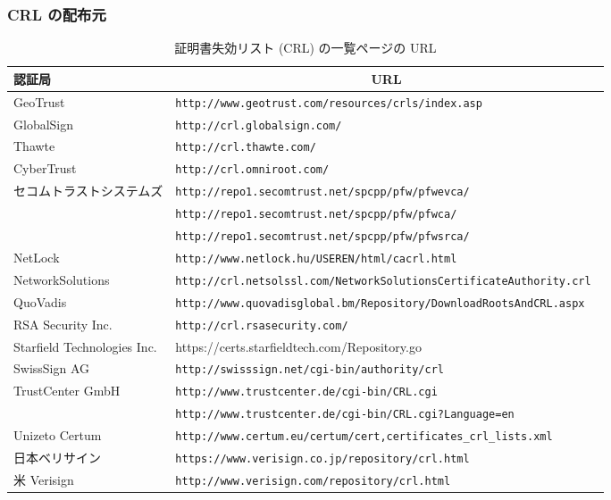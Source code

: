 \documentclass[mingoth,a4paper]{jsarticle}
\begin{document}
\subsubsection{CRL の配布元}

\begin{table}
\caption{証明書失効リスト (CRL) の一覧ページの URL}\label{tab:crlwebpage}
\begin{center}
\begin{tabular}{|l|l|}\hline
認証局 & \multicolumn{1}{c|}{URL} \\ \hline\hline
GeoTrust & \tt http://www.geotrust.com/resources/crls/index.asp  \\ \hline
GlobalSign & \tt http://crl.globalsign.com/ \\ \hline
Thawte & \tt http://crl.thawte.com/ \\  \hline
CyberTrust & \tt http://crl.omniroot.com/ \\  \hline
セコムトラストシステムズ & \tt \tt http://repo1.secomtrust.net/spcpp/pfw/pfwevca/ \\  \cline{2-2}
 & \tt  http://repo1.secomtrust.net/spcpp/pfw/pfwca/ \\  \cline{2-2}
 & \tt http://repo1.secomtrust.net/spcpp/pfw/pfwsrca/ \\ \hline
NetLock & \tt http://www.netlock.hu/USEREN/html/cacrl.html \\ \hline
NetworkSolutions & \tt http://crl.netsolssl.com/NetworkSolutionsCertificateAuthority.crl \\ \hline
QuoVadis & \tt http://www.quovadisglobal.bm/Repository/DownloadRootsAndCRL.aspx \\ \hline
RSA Security Inc. & \tt http://crl.rsasecurity.com/ \\ \hline
Starfield Technologies Inc. & https://certs.starfieldtech.com/Repository.go \\ \hline
SwissSign AG & \tt http://swisssign.net/cgi-bin/authority/crl \\ \hline
TrustCenter GmbH & \tt http://www.trustcenter.de/cgi-bin/CRL.cgi \\ \cline{2-2}
& \tt http://www.trustcenter.de/cgi-bin/CRL.cgi?Language=en \\ \hline
Unizeto Certum & \tt http://www.certum.eu/certum/cert,certificates\_crl\_lists.xml \\ \hline
日本ベリサイン  &  \tt https://www.verisign.co.jp/repository/crl.html \\ \hline
米 Verisign & \tt  http://www.verisign.com/repository/crl.html \\ \hline

\end{tabular}
\end{center}
\end{table}
\end{document}
